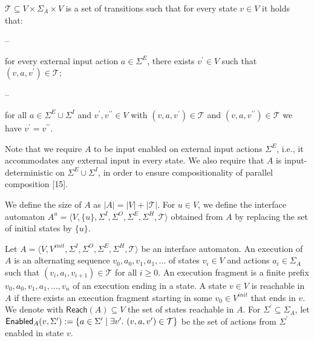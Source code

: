 \documentclass[10pt,a4paper]{article}
\begin{document}
$\mathcal{T}\subseteq V\times\Sigma_{A}\times V$ is a set of transitions such that for every state $v\in V$ it holds that:\par
  
\par\noindent  – 
 
for every external input action $a\in\Sigma^{E}$, there exists $v^{\prime}\in V$ such that $(v,a,v^{\prime})\in\mathcal{T}$;\par
 
 
 
\par\noindent  – 
 
for all $a\in\Sigma^{E}\cup\Sigma^{I}$ and $v^{\prime},v^{\prime\prime}\in V$ with $(v,a,v^{\prime})\in\mathcal{T}$ and $(v,a,v^{\prime\prime})\in\mathcal{T}$ we have $v^{\prime}=v^{\prime\prime}$.\par
 
 
  
 
  
 
 
 
Note that we require $A$ to be input enabled on external input actions $\Sigma^{E}$, i.e., it accommodates any external input in every state. We also require that $A$ is input-deterministic on $\Sigma^{E}\cup\Sigma^{I}$, in order to ensure compositionality of parallel composition [15].\par
 
 
 
We define the size of $A$ as $|A|=|V|+|\mathcal{T}|$. For $u\in V$, we define the interface automaton $A^{u}=\langle V,\{u\},\Sigma^{I},\Sigma^{O},\Sigma^{E},\Sigma^{H},\mathcal{T}\rangle$ obtained from $A$ by replacing the set of initial states by $\{u\}$.\par
 
 
 
Let $A=\langle V,V^{init},\Sigma^{I},\Sigma^{O},\Sigma^{E},\Sigma^{H},\mathcal{T}\rangle$ be an interface automaton. An execution of $A$ is an alternating sequence $v_{0},a_{0},v_{1},a_{1},\dots$ of states $v_{i}\in V$ and actions $a_{i}\in\Sigma_{A}$ such that $(v_{i},a_{i},v_{i+1})\in\mathcal{T}$ for all $i\geq 0$. An execution fragment is a finite prefix $v_{0},a_{0},v_{1},a_{1},\dots,v_{n}$ of an execution ending in a state. A state $v\in V$ is reachable in $A$ if there exists an execution fragment starting in some $v_{0}\in V^{init}$ that ends in $v$. We denote with $\mathsf{Reach}(A)\subseteq V$ the set of states reachable in $A$. For $\Sigma^{\prime}\subseteq\Sigma_{A}$, let $\mathsf{Enabled}_{A}(v,\Sigma^{\prime}):=\{a\in\Sigma^{\prime}\mid\exists v^{\prime}.\nobreak\ (v,a,v^{\prime})\in\mathcal{T}\}$ be the set of actions from $\Sigma^{\prime}$ enabled in state $v$.\par
 
\end{document}
